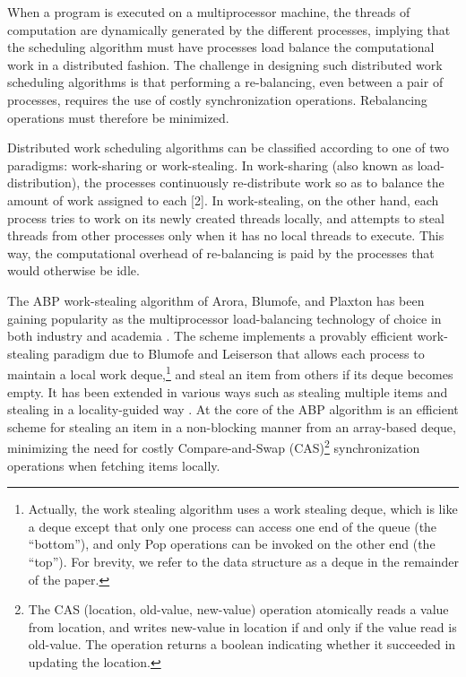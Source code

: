 When a program is executed on a multiprocessor machine, the threads
of computation are dynamically generated by the different processes,
implying that the scheduling algorithm must have processes load
balance the computational work in a distributed fashion. The
challenge in designing such distributed work scheduling algorithms
is that performing a re-balancing, even between a pair of processes,
requires the use of costly synchronization operations. Rebalancing
operations must therefore be minimized.

Distributed work scheduling algorithms can be classified according to
one of two paradigms: work-sharing or work-stealing. In work-sharing
(also known as load-distribution), the processes continuously
re-distribute work so as to balance the amount of work assigned to
each [2]. In work-stealing, on the other hand, each process tries to
work on its newly created threads locally, and attempts to steal
threads from other processes only when it has no local threads to
execute. This way, the computational overhead of re-balancing is paid
by the processes that would otherwise be idle.

The ABP work-stealing algorithm of Arora, Blumofe, and Plaxton
\cite{Arora2001} has been gaining popularity as the multiprocessor
load-balancing technology of choice in both industry and academia
\cite{Arora2001, Acar2002, Blumofe1995, Frigo1998, Danaher2005}. The
scheme implements a provably efficient work-stealing paradigm due to
Blumofe and Leiserson \cite{Blumofe1999} that allows each process to
maintain a local work deque,\footnote{Actually, the work stealing
  algorithm uses a work stealing deque, which is like a deque
  \cite{Knuth1997} except that only one process can access one end of
  the queue (the ``bottom''), and only Pop operations can be invoked
  on the other end (the ``top''). For brevity, we refer to the data
  structure as a deque in the remainder of the paper.} and steal an
item from others if its deque becomes empty. It has been extended in
various ways such as stealing multiple items \cite{Hendler2002} and
stealing in a locality-guided way \cite{Acar2002}. At the core of the
ABP algorithm is an efficient scheme for stealing an item in a
non-blocking manner from an array-based deque, minimizing the need for
costly Compare-and-Swap (CAS)\footnote{The CAS (location, old-value,
  new-value) operation atomically reads a value from location, and
  writes new-value in location if and only if the value read is
  old-value. The operation returns a boolean indicating whether it
  succeeded in updating the location.} synchronization operations when
fetching items locally.

